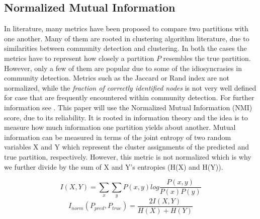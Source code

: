 \documentclass[11pt, twocolumn]{article}
\begin{document}
\subsection{Normalized Mutual Information} 
In literature, many metrics have been proposed to compare two partitions with one another. Many of them are rooted in clustering algorithm literature, due to similarities between community detection and clustering. In both the cases the metrics have to represent how closely a partition $P$ resembles the true partition. However, only a few of them are popular due to some of the idiosyncrasies in community detection. Metrics such as the Jaccard or Rand index are not normalized, while the \emph{fraction of correctly identified nodes} is not very well defined for case that are frequently encountered within community detection. For further information see \citeauthor{fortunato_CommunityDetectionNetworks_2016}. This paper will use the Normalized Mutual Information (NMI) score, due to its reliability. It is rooted in information theory and the idea is to measure how much information one partition yields about another. Mutual information can be measured in terms of the joint entropy of two random variables X and Y which represent the cluster assignments of the predicted and true partition, respectively. However, this metric is not normalized which is why we further divide by the sum of X and Y's entropies (H(X) and H(Y)). 

\begin{equation}
I(X,Y) = \sum_x\sum_y P(x,y) log\frac{P(x,y)}{P(x)P(y)}
\end{equation}
\begin{equation}
I_{norm}(P_{pred},P_{true}) = \frac{2I(X,Y)}{H(X) + H(Y)}
\end{equation}
\end{document}
